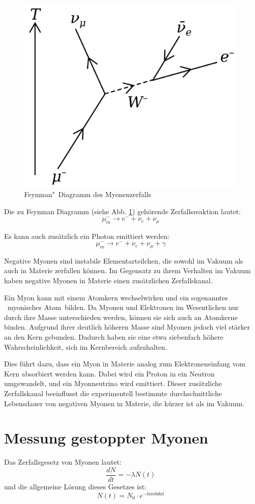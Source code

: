 \documentclass[12pt,a4paper,ngerman]{report}
\begin{document}
		\begin{figure}[ht]
		\centering
		\includegraphics[width=.7\textwidth]{Bilder/Feynman_Myon}		
		\caption{Feynman"~Diagramm des Myonenzerfalls}
		\label{fig:Feynman_Myon}
	\end{figure}
	
	Die zu Feynman Diagramm (siehe Abb. \ref{fig:Feynman_Myon}) gehörende Zerfallsreaktion lautet:
	\[\mu^{-}_{m} \rightarrow e^{-} + \nu_e + \nu_{\mu} \]
	
	Es kann auch zusätzlich ein Photon emittiert werden:
	\[\mu^{-}_{m} \rightarrow e^{-} + \nu_e + \nu_{\mu} + \gamma \]
	
	Negative Myonen sind instabile Elementarteilchen, die sowohl im Vakuum als auch in Materie zerfallen können. Im Gegensatz zu ihrem Verhalten im Vakuum haben negative Myonen in Materie einen zusätzlichen Zerfallskanal.
	
	Ein Myon kann mit einem Atomkern wechselwirken und ein sogenanntes \glqq~myonisches Atom\grqq~bilden. Da Myonen und Elektronen im Wesentlichen nur durch ihre Masse unterschieden werden, können sie sich auch an Atomkerne binden. Aufgrund ihrer deutlich höheren Masse sind Myonen jedoch viel stärker an den Kern gebunden. Dadurch haben sie eine etwa siebenfach höhere Wahrscheinlichkeit, sich im Kernbereich aufzuhalten.
	
	Dies führt dazu, dass ein Myon in Materie analog zum Elektroneneinfang vom Kern absorbiert werden kann. Dabei wird ein Proton in ein Neutron umgewandelt, und ein Myonneutrino wird emittiert. Dieser zusätzliche Zerfallskanal beeinflusst die experimentell bestimmte durchschnittliche Lebensdauer von negativen Myonen in Materie, die kürzer ist als im Vakuum.

	\section{Messung gestoppter Myonen} \label{ch:Mess}
		Das Zerfallsgesetz von Myonen lautet:
		\[\frac{dN}{dt}= -\lambda N(t)\]
		und die allgemeine Lösung dieses Gesetzes ist:
		\[N(t) = N_0 \cdot e^{-lambda t}\]
		
\end{document}
